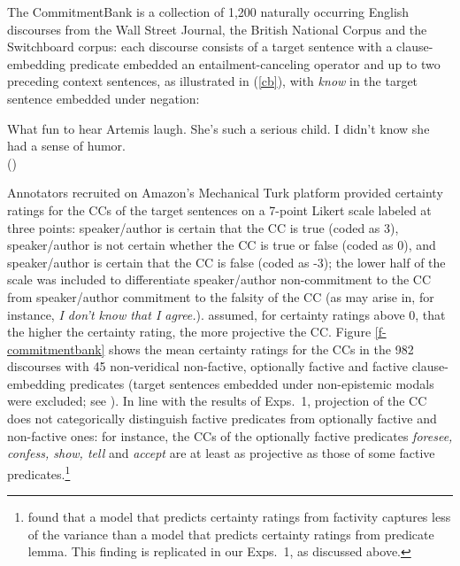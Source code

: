 \documentclass[11pt,fleqn]{article}
\newcommand{\6}{\mbox{$[\hspace*{-.6mm}[$}}
\newcommand{\9}{\mbox{$]\hspace*{-.6mm}]$}}
\begin{document}
The CommitmentBank is a collection of 1,200 naturally occurring English discourses from the Wall Street Journal, the British National Corpus and the Switchboard corpus: each discourse consists of a target sentence with a clause-embedding predicate embedded an entailment-canceling operator and up to two preceding context sentences, as illustrated in (\ref{cb}), with {\em know} in the target sentence embedded under negation:

\begin{exe}
\ex\label{cb} What fun to hear Artemis laugh. She's such a serious child. I didn't know she had a sense of humor. \\ \hspace*{.2cm} \hfill (\citealt[109]{demarneffe-etal-sub23})
\end{exe}
Annotators recruited on Amazon's Mechanical Turk platform provided certainty ratings for the CCs of the target sentences on a 7-point Likert scale labeled at three points: speaker/author is certain that the CC is true (coded as 3), speaker/author is not certain whether the CC is true or false (coded as 0), and speaker/author is certain that the CC is false (coded as -3); the lower half of the scale was included to differentiate speaker/author non-commitment to the CC from speaker/author commitment to the falsity of the CC (as may arise in, for instance, {\em I don't know that I agree.}). \citet{demarneffe-etal-sub23} assumed, for certainty ratings above 0, that the higher the certainty rating, the more projective the CC. Figure \ref{f-commitmentbank} shows the mean certainty ratings for the CCs in the 982 discourses with 45 non-veridical non-factive, optionally factive and factive clause-embedding predicates (target sentences embedded under non-epistemic modals were excluded; see \citealt[\S3]{demarneffe-etal-sub23}). In line with the results of Exps.~1, projection of the CC does not categorically distinguish factive predicates from optionally factive and non-factive ones: for instance, the CCs of the optionally factive predicates {\em foresee, confess, show, tell} and {\em accept} are at least as projective as those of some factive predicates.\footnote{\citealt{demarneffe-etal-sub23} found that a model that predicts certainty ratings from factivity captures less of the variance than a model that predicts certainty ratings from predicate lemma. This finding is replicated in our Exps.~1, as discussed above.}
\end{document}
